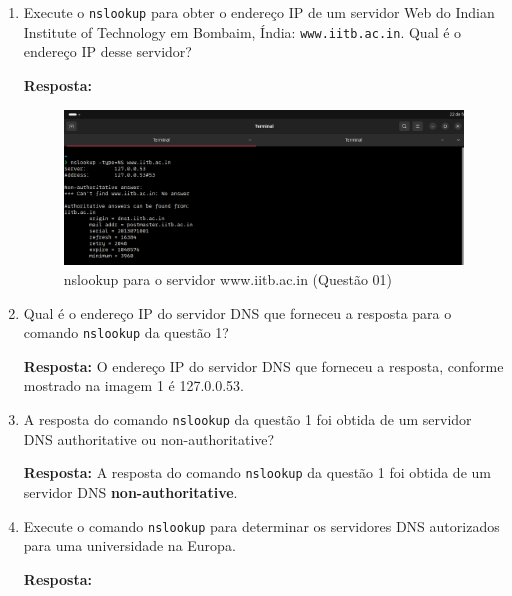 \documentclass[12pt,a4paper]{report}
\begin{document}
	\begin{enumerate}
		\item Execute o \texttt{nslookup} para obter o endereço IP de um servidor Web do Indian Institute of Technology em Bombaim, Índia: \texttt{www.iitb.ac.in}. Qual é o endereço IP desse servidor?
		
		\textbf{Resposta:} 

		\begin{figure}[H]
			\centering
			\includegraphics[width=1\textwidth]{q1.png}
			\caption{nslookup para o servidor www.iitb.ac.in (Questão 01)}
			\label{fig:q1}
		\end{figure}

		\item Qual é o endereço IP do servidor DNS que forneceu a resposta para o comando \texttt{nslookup} da questão 1?
		
		\textbf{Resposta:} O endereço IP do servidor DNS que forneceu a resposta, conforme mostrado na imagem 1 é 127.0.0.53.

		\item A resposta do comando \texttt{nslookup} da questão 1 foi obtida de um servidor DNS authoritative ou non-authoritative?
		
		\textbf{Resposta:} A resposta do comando \texttt{nslookup} da questão 1 foi obtida de um servidor DNS \textbf{non-authoritative}.

		\item Execute o comando \texttt{nslookup} para determinar os servidores DNS autorizados para uma universidade na Europa.
		
		\textbf{Resposta:}


\end{enumerate}
\end{document}
